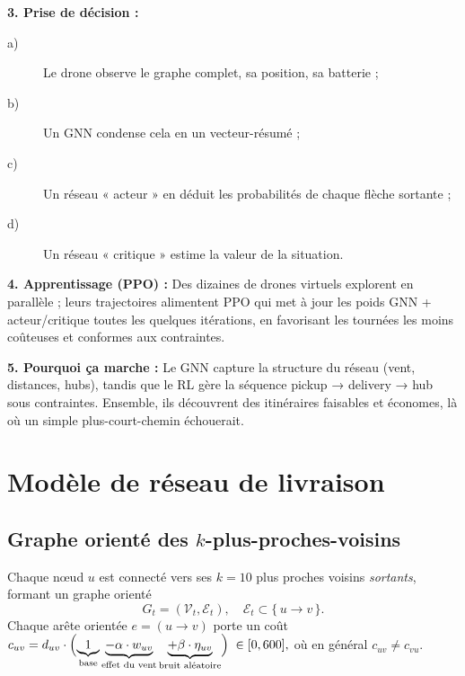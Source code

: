 \documentclass[11pt,a4paper]{article}
\begin{document}
\textbf{3. Prise de décision :}
\begin{description}
\item[a)] Le drone observe le graphe complet, sa position, sa batterie ;
\item[b)] Un GNN condense cela en un vecteur-résumé ;
\item[c)] Un réseau « acteur » en déduit les probabilités de chaque flèche sortante ;
\item[d)] Un réseau « critique » estime la valeur de la situation.
\end{description}


\textbf{4. Apprentissage (PPO) :}  
Des dizaines de drones virtuels explorent en parallèle ; leurs trajectoires alimentent PPO qui met à jour les poids GNN + acteur/critique toutes les quelques itérations, en favorisant les tournées les moins coûteuses et conformes aux contraintes.

\textbf{5. Pourquoi ça marche :}  
Le GNN capture la structure du réseau (vent, distances, hubs), tandis que le RL gère la séquence pickup → delivery → hub sous contraintes. Ensemble, ils découvrent des itinéraires faisables et économes, là où un simple plus-court-chemin échouerait.

\section{Modèle de réseau de livraison}

\subsection{Graphe orienté des \texorpdfstring{\(k\)}{k}-plus-proches-voisins}
Chaque nœud \(u\) est connecté vers ses \(k=10\) plus proches voisins \emph{sortants}, formant un graphe orienté 
\[
  G_t = (\mathcal{V}_t,\mathcal{E}_t),\quad \mathcal{E}_t\subset \{\,u\to v\,\}.
\]
Chaque arête orientée \(e=(u\!\to\!v)\) porte un coût 
\(
  c_{uv}
  = d_{uv} \cdot \Bigl(
  \underbrace{1}_{\text{base}}
  \underbrace{- \alpha \cdot w_{uv}}_{\text{effet du vent}}
  \underbrace{+ \beta \cdot \eta_{uv}}_{\text{bruit aléatoire}}
  \Bigr)
  \;\in[0,600],
\)
où en général \(c_{uv}\neq c_{vu}\).
\end{document}
